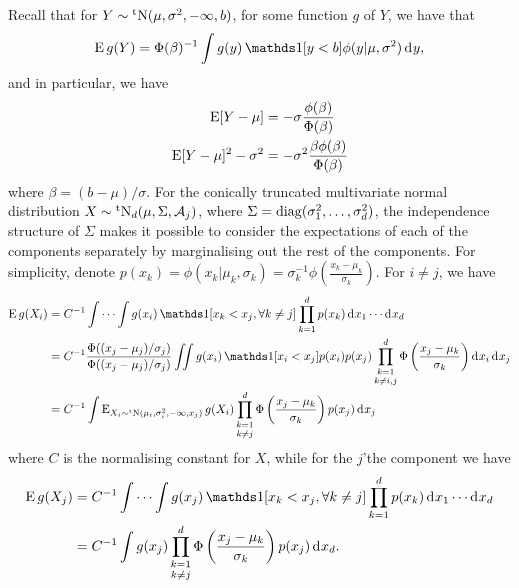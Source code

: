 Recall that for $Y \sim \operatorname{{}^tN}(\mu,\sigma^2,-\infty,b)$, for some function $g$ of $Y$, we have that
\[
  \E g(Y) = \Phi(\beta)^{-1} \int g(y) \ind[y < b] \phi(y|\mu,\sigma^2) \dint y,
\]
and in particular, we have
\begin{align}
  \operatorname{E}[Y - \mu] &= -\sigma \frac{\phi(\beta)}{\Phi(\beta)} \label{eq:tnXminMu} \\
  \operatorname{E}[Y - \mu]^2 - \sigma^2 &= -\sigma^2   \frac{ \beta\phi(\beta)}{\Phi(\beta)} \label{eq:tnXminMusq}
\end{align}
where $\beta = (b - \mu)/\sigma$.
For the conically truncated multivariate normal distribution $X \sim \operatorname{{}^tN}_d(\mu,\Sigma,{\mathcal A}_j)$, where $\Sigma = \operatorname{diag}(\sigma_1^2,\dots,\sigma_d^2)$, the independence structure of $\Sigma$ makes it possible to consider the expectations of each of the components separately by marginalising out the rest of the components. 
For simplicity, denote $p(x_k) = \phi(x_k|\mu_k,\sigma_k) = \sigma^{-1}_k \phi(\frac{x_k - \mu_k}{\sigma_k})$.
For $i \neq j$, we have
\begin{align}
  \E g(X_i)
  &= C^{-1} \idotsint  g(x_i) \ind[x_k < x_j, \forall k \neq j]  \prod_{k=1}^d p(x_k) \dint x_1 \cdots \dint x_d \nonumber \\
  &= C^{-1} \frac{\Phi((x_j-\mu_j)/\sigma_j)}{\Phi((x_j-\mu_j)/\sigma_j)} \iint g(x_i) \ind[x_i < x_j] p(x_i) p(x_j) \mathop{\prod_{k=1}^d}_{k \neq i,j} \Phi \left( \frac{x_j - \mu_k}{\sigma_k} \right)  \dint x_i \dint x_j \nonumber \\
  &= C^{-1}  \int \E_{X_i\sim\tN(\mu_i,\sigma_i^2,-\infty,x_j)} g(X_i) \mathop{\prod_{k=1}^d}_{k \neq j} \Phi \left( \frac{x_j - \mu_k}{\sigma_k} \right)  p(x_j)\dint x_j \label{eq:tnproofi}
  \end{align}
where $C$ is the normalising constant for $X$, while for the $j$'the component we have
\begin{align}
  \E g(X_j)
  &= C^{-1} \idotsint  g(x_j) \ind[x_k < x_j, \forall k \neq j]  \prod_{k=1}^d p(x_k) \dint x_1 \cdots \dint x_d \nonumber \\
  &= C^{-1} \int  g(x_j)  \mathop{\prod_{k=1}^d}_{k \neq j} \Phi \left( \frac{x_j - \mu_k}{\sigma_k} \right) p(x_j) \dint x_d. \label{eq:tnproofj}  
\end{align}

